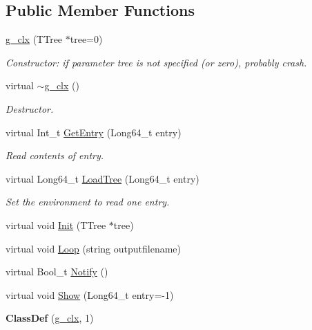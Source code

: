 \subsection*{Public Member Functions}
\begin{DoxyCompactItemize}
\item 
\mbox{\label{classg__clx_aa619daf508fe1d6bddb000af26630f31}} 
\hyperlink{classg__clx_aa619daf508fe1d6bddb000af26630f31}{g\+\_\+clx} (T\+Tree $\ast$tree=0)
\begin{DoxyCompactList}\small\item\em Constructor\+: if parameter tree is not specified (or zero), probably crash. \end{DoxyCompactList}\item 
\mbox{\label{classg__clx_adbe899d82aba9fc16ec17f47c0ce894e}} 
virtual \hyperlink{classg__clx_adbe899d82aba9fc16ec17f47c0ce894e}{$\sim$g\+\_\+clx} ()
\begin{DoxyCompactList}\small\item\em Destructor. \end{DoxyCompactList}\item 
\mbox{\label{classg__clx_ab4c53e12e70c3671ff8895fc388dd7d2}} 
virtual Int\+\_\+t \hyperlink{classg__clx_ab4c53e12e70c3671ff8895fc388dd7d2}{Get\+Entry} (Long64\+\_\+t entry)
\begin{DoxyCompactList}\small\item\em Read contents of entry. \end{DoxyCompactList}\item 
\mbox{\label{classg__clx_a0aab3745bdb3db08757c974eebffbe39}} 
virtual Long64\+\_\+t \hyperlink{classg__clx_a0aab3745bdb3db08757c974eebffbe39}{Load\+Tree} (Long64\+\_\+t entry)
\begin{DoxyCompactList}\small\item\em Set the environment to read one entry. \end{DoxyCompactList}\item 
virtual void \hyperlink{classg__clx_a92531261155ea15bee6b74c7e491132a}{Init} (T\+Tree $\ast$tree)
\item 
virtual void \hyperlink{classg__clx_a9d5de859df4bfbb746726661ff1d24a9}{Loop} (string outputfilename)
\item 
virtual Bool\+\_\+t \hyperlink{classg__clx_a1fe81316168bc18dc2325ca5595577a9}{Notify} ()
\item 
virtual void \hyperlink{classg__clx_ae86183470c7bb8db45753aa4c86f1d41}{Show} (Long64\+\_\+t entry=-\/1)
\item 
\mbox{\label{classg__clx_a8d0a8ed3a7cc55ca97aeb77f4183d3b8}} 
{\bfseries Class\+Def} (\hyperlink{classg__clx}{g\+\_\+clx}, 1)
\end{DoxyCompactItemize}
